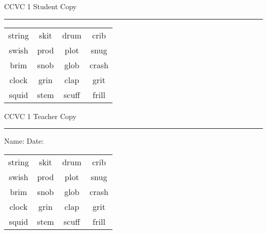 \documentclass{memoir}
\begin{document}

\footnotesize \noindent
CCVC 1 \hfill Student Copy
\smallskip
\hrule

\Large

\setlength{\tabcolsep}{14pt}
\def\arraystretch{3}

{\selectfont


\begin{vplace}[0.5]
\begin{center}
\begin{tabular}{cccc}
string & skit & drum & crib \\
swish & prod & plot & snug \\
brim      & snob & glob & crash \\
clock & grin     & clap             & grit      \\
squid & stem & scuff & frill \\
\end{tabular}
\end{center}
\end{vplace}

}

\newpage

\footnotesize \noindent
CCVC 1 \hfill Teacher Copy
\smallskip
\hrule

\small

\vfill

\noindent
Name: \underline{\hspace{1.75in}} \hfill Date: \underline{\hspace{1in}}

\Large

{\selectfont


\begin{vplace}[0.5]
\begin{center}
\begin{tabular}{cccc}
string & skit & drum & crib \\
swish & prod & plot & snug \\
brim      & snob & glob & crash \\
clock & grin     & clap             & grit      \\
squid & stem & scuff & frill \\
\end{tabular}
\end{center}
\end{vplace}



}
\end{document}
